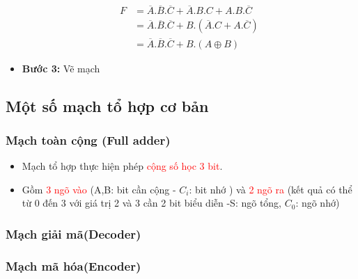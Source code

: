 \documentclass[12pt]{article}
\begin{document}
\begin{sloppypar}
\begin{itemize}
    \begin{align*}
        F & = \overline{A}.\overline{B}.\overline{C} + \overline{A}.B.C + A.B.\overline{C} \\
          & = \overline{A}.\overline{B}.\overline{C} + B.(\overline{A}.C + A.\overline{C}) \\
          & = \overline{A}.\overline{B}.\overline{C} + B.(A \oplus B)
    \end{align*}

    \item \textbf{Bước 3:} Vẽ mạch


\end{itemize}

\subsection{Một số mạch tổ hợp cơ bản}
\subsubsection{Mạch toàn cộng (Full adder)}
\begin{itemize}
    \item Mạch tổ hợp thực hiện phép \textcolor{red}{cộng số học 3 bit}.
    \item Gồm \textcolor{red}{3 ngõ vào} (A,B: bit cần cộng - \(C_{i}\): bit nhớ ) và \textcolor{red}{2 ngõ ra} (kết quả có thể từ 0 đến 3 với giá trị 2 và 3 cần 2 bit biểu diễn -S: ngõ tổng, \(C_{0}\): ngõ nhớ)
\end{itemize}
\subsubsection{Mạch giải mã(Decoder)}
\subsubsection{Mạch mã hóa(Encoder)}
\end{sloppypar}
\end{document}
